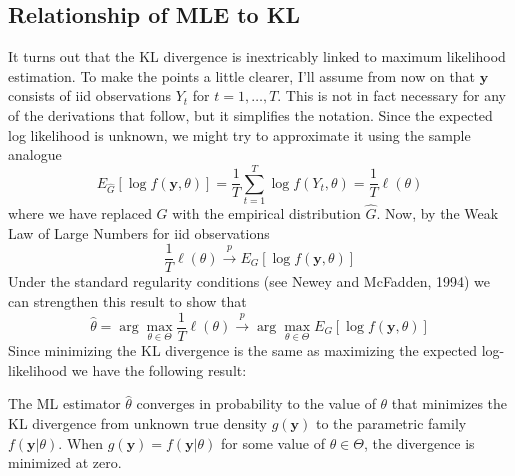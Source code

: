 \subsection{Relationship of MLE to KL}
It turns out that the KL divergence is inextricably linked to maximum likelihood estimation. To make the points a little clearer, I'll assume from now on that $\mathbf{y}$ consists of iid observations $Y_t$ for $t = 1, \hdots, T$. This is not in fact necessary for any of the derivations that follow, but it simplifies the notation. Since the expected log likelihood is unknown, we might try to approximate it using the sample analogue
$$E_{\widehat{G}}\left[\log{f(\textbf{y},\theta)} \right] = \frac{1}{T}\sum_{t=1}^T \log{f(Y_t, \theta)} = \frac{1}{T}\ell(\theta)$$
where we have replaced $G$ with the empirical distribution $\widehat{G}$. Now, by the Weak Law of Large Numbers for iid observations
$$\frac{1}{T} \ell(\theta) \overset{p}{\rightarrow} E_G\left[ \log{f(\textbf{y},\theta)} \right]$$
Under the standard regularity conditions (see Newey and McFadden, 1994) we can strengthen this result to show that
$$\hat{\theta} = \arg \max_{\theta \in \Theta} \frac{1}{T}\ell(\theta) \overset{p}{\rightarrow} \arg \max_{\theta \in \Theta} E_G\left[ \log{f(\textbf{y},\theta)}\right]$$
Since minimizing the KL divergence is the same as maximizing the expected log-likelihood we have the following result:
\begin{pro}
The ML estimator $\hat{\theta}$ converges in probability to the value of $\theta$ that minimizes the KL divergence from unknown true density $g(\mathbf{y})$ to the parametric family $f(\mathbf{y}|\theta)$. When $g(\mathbf{y})=f(\mathbf{y}|\theta)$ for some value of $\theta \in \Theta$, the divergence is minimized at zero.
\end{pro}


